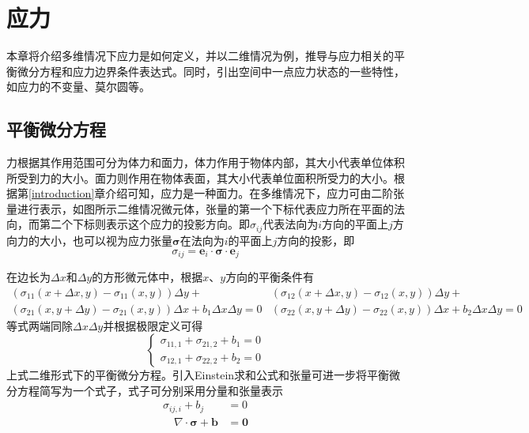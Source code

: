 \chapter{应力}
本章将介绍多维情况下应力是如何定义，并以二维情况为例，推导与应力相关的平衡微分方程和应力边界条件表达式。同时，引出空间中一点应力状态的一些特性，如应力的不变量、莫尔圆等。
\section{平衡微分方程}
力根据其作用范围可分为体力和面力，体力作用于物体内部，其大小代表单位体积所受到力的大小。面力则作用在物体表面，其大小代表单位面积所受力的大小。根据第\ref{introduction}章介绍可知，应力是一种面力。在多维情况下，应力可由二阶张量进行表示，如图所示二维情况微元体，张量的第一个下标代表应力所在平面的法向，而第二个下标则表示这个应力的投影方向。即$\sigma_{ij}$代表法向为$i$方向的平面上$j$方向力的大小，也可以视为应力张量$\boldsymbol \sigma$在法向为$i$的平面上$j$方向的投影，即
\begin{equation}
\sigma_{ij} = \boldsymbol e_i \cdot \boldsymbol \sigma \cdot \boldsymbol e_j
\end{equation}\par
在边长为$\Delta x$和$\Delta y$的方形微元体中，根据$x$、$y$方向的平衡条件有
\begin{subequations}\label{ch_stress:xyeq}
\begin{multline}
    (\sigma_{11}(x+\Delta x,y) - \sigma_{11}(x,y))\Delta y + \\ (\sigma_{21}(x,y+\Delta y)-\sigma_{21}(x,y))\Delta x + b_1 \Delta x \Delta y = 0
\end{multline}
\begin{multline}
    (\sigma_{12}(x+\Delta x,y) - \sigma_{12}(x,y))\Delta y + \\ (\sigma_{22}(x,y+\Delta y)-\sigma_{22}(x,y))\Delta x + b_2 \Delta x \Delta y = 0
\end{multline}
\end{subequations}
等式两端同除$\Delta x \Delta y$并根据极限定义可得
\begin{equation}
\begin{cases}
\sigma_{11,1} + \sigma_{21,2} + b_1 = 0 \\
\sigma_{12,1} + \sigma_{22,2} + b_2 = 0 
\end{cases}
\end{equation}
上式二维形式下的平衡微分方程。引入Einstein求和公式和张量可进一步将平衡微分方程简写为一个式子，式子可分别采用分量和张量表示
\begin{subequations}\label{ch_stress:eqtensor}
    \begin{align}
        \sigma_{ij,i} + b_j &= 0 \\
        \quad \nabla \cdot \boldsymbol \sigma + \boldsymbol b &= \boldsymbol 0
    \end{align}
\end{subequations}\par
